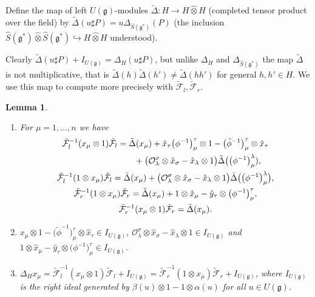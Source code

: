 \documentclass[10pt,a4paper]{amsart}
\def\gg{\mathfrak{g}}
\def\hx{\hat{x}}
\def\hy{\hat{y}}
\newtheorem{Lemma}[Theorem]{Lemma}
\numberwithin{equation}{section}
\begin{document}
\begin{Definition}
Define the map of left $U(\gg)$-modules $\tilde\Delta\colon H\to H\hat\otimes H$ (completed tensor product over the field) by $\tilde\Delta(u\sharp P) = u\Delta_{\hat{S}(\gg^*)}(P)$ (the inclusion $\hat{S}(\gg^*)\hat\otimes\hat{S}(\gg^*)\hookrightarrow H\hat\otimes H$ understood).
\end{Definition}
\begin{Remark}\label{rem:tDDH}
Clearly $\tilde\Delta(u\sharp P)+I_{U(\gg)} = \Delta_H(u\sharp P)$, but unlike $\Delta_H$ and $\Delta_{\hat{S}(\gg^*)}$ the map $\tilde\Delta$ is not multiplicative, that is $\tilde\Delta(h)\tilde\Delta(h')\neq\tilde\Delta(h h')$ for general $h,h'\in H$. We use this map to compute more precisely with $\tilde{\mathcal{F}}_l, \tilde{\mathcal{F}}_r$.
\end{Remark}
\begin{Lemma}\label{lem:DeltaFx}\quad
\begin{enumerate}\itemsep=0pt
\item[$(i)$] For $\mu = 1,\dots, n$ we have
\begin{gather}
\tilde{\mathcal{F}}_l^{-1}(x_\mu\otimes 1)\tilde{\mathcal{F}}_l = \tilde\Delta(x_\mu)
+ \hx_\tau\big(\phi^{-1}\big)^\tau_\mu\otimes 1 - \big(\tilde\phi^{-1}\big)^\tau_\mu\otimes\hx_\tau\nonumber\\
\hphantom{\tilde{\mathcal{F}}_l^{-1}(x_\mu\otimes 1)\tilde{\mathcal{F}}_l =}{}
+ \big(\mathcal{O}^\sigma_\lambda\otimes\hx_\sigma-\hx_\lambda\otimes 1\big)\tilde\Delta\big(\big(\phi^{-1}\big)^\lambda_\mu),\label{eq:tFLx1FL}
\\
\label{eq:tFL1xFL}
\tilde{\mathcal{F}}_l^{-1}(1\otimes x_\mu)\tilde{\mathcal{F}}_l =
\tilde\Delta(x_\mu)+\big(\mathcal{O}^\sigma_\lambda\otimes\hx_\sigma-\hx_\lambda\otimes 1\big)\tilde\Delta\big(\big(\phi^{-1}\big)^\lambda_\mu\big),
\\ \label{eq:tFR1xFR}
\tilde{\mathcal{F}}_r^{-1}(1\otimes x_\mu)\tilde{\mathcal{F}}_r = \tilde\Delta(x_\mu)+1\otimes\hx_\mu - \hy_\tau\otimes\big(\phi^{-1}\big)^\tau_\mu,
\\ \label{eq:tFRx1FR}
\tilde{\mathcal{F}}_r^{-1}(x_\mu\otimes 1)\tilde{\mathcal{F}}_r = \tilde\Delta(x_\mu).
\end{gather}

\item[$(ii)$] $x_\mu\otimes 1 - \big(\tilde\phi^{-1}\big)^\tau_\mu\otimes\hat{x}_\tau\in I_{U(\gg)}$,
$\mathcal{O}^\sigma_\lambda\otimes\hx_\sigma-\hx_\lambda\otimes 1\in I_{U(\gg)}$
and $1\otimes\hx_\mu - \hy_\tau\otimes\big(\phi^{-1}\big)^\tau_\mu\in I_{U(\gg)}$.

\item[$(iii)$] $\Delta_H x_\mu = \tilde{\mathcal{F}}_l^{-1}(x_\mu\otimes 1)\tilde{\mathcal{F}}_l + I_{U(\gg)}
= \tilde{\mathcal{F}}_r^{-1}(1\otimes x_\mu)\tilde{\mathcal{F}}_r + I_{U(\gg)}$,
where $I_{U(\gg)}$ is the right ideal generated by $\beta(u)\otimes 1 - 1\otimes \alpha(u)$ for all $u\in U(\gg)$.
\end{enumerate}
\end{Lemma}
\end{document}
